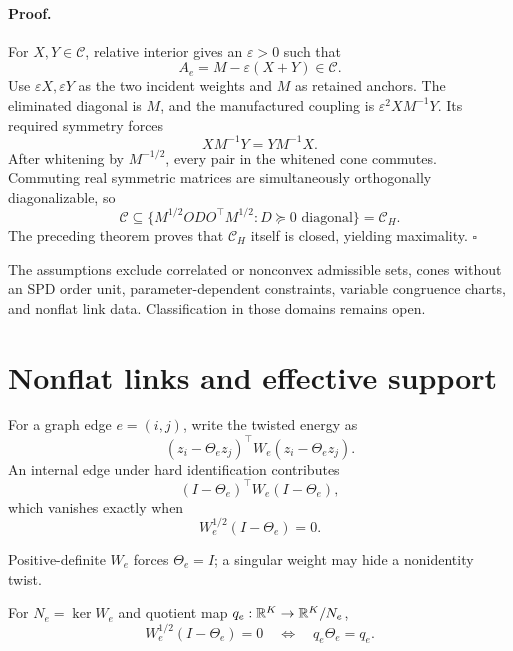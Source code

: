 \paragraph{Proof.}
For \(X,Y\in\mathcal C\), relative interior gives an
\(\varepsilon>0\) such that
\[
A_e=M-\varepsilon(X+Y)\in\mathcal C.
\]
Use \(\varepsilon X,\varepsilon Y\) as the two incident weights and \(M\)
as retained anchors. The eliminated diagonal is \(M\), and the manufactured
coupling is \(\varepsilon^2XM^{-1}Y\). Its required symmetry forces
\[
XM^{-1}Y=YM^{-1}X.
\]
After whitening by \(M^{-1/2}\), every pair in the whitened cone commutes.
Commuting real symmetric matrices are simultaneously orthogonally
diagonalizable, so
\[
\mathcal C\subseteq
\{M^{1/2}ODO^\top M^{1/2}:D\succeq0\text{ diagonal}\}
=\mathcal C_H.
\]
The preceding theorem proves that \(\mathcal C_H\) itself is closed, yielding
maximality. \(\square\)

The assumptions exclude correlated or nonconvex admissible sets, cones
without an SPD order unit, parameter-dependent constraints, variable
congruence charts, and nonflat link data. Classification in those domains
remains open. 

\section{Nonflat links and effective support}
\label{sec:cg-effective-support}

For a graph edge \(e=(i,j)\), write the twisted energy as
\begin{equation}
(z_i-\Theta_ez_j)^\top W_e(z_i-\Theta_ez_j).
\label{eq:cg-twisted-pair}
\end{equation}
An internal edge under hard identification contributes
\begin{equation}
(I-\Theta_e)^\top W_e(I-\Theta_e),
\label{eq:cg-internal-residual}
\end{equation}
which vanishes exactly when
\begin{equation}
W_e^{1/2}(I-\Theta_e)=0.
\label{eq:cg-weighted-invisibility}
\end{equation}

Positive-definite \(W_e\) forces \(\Theta_e=I\); a singular weight may hide a
nonidentity twist. 

For \(N_e=\ker W_e\) and quotient map \(q_e:\mathbb R^K\to\mathbb R^K/N_e\),
\begin{equation}
W_e^{1/2}(I-\Theta_e)=0
\quad\Longleftrightarrow\quad
q_e\Theta_e=q_e.
\label{eq:cg-edge-quotient}
\end{equation}

